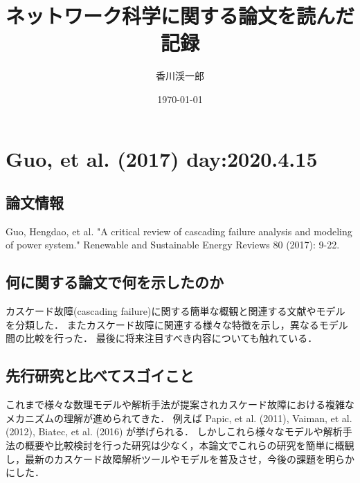 \documentclass[a4paper,11pt]{jsarticle}
\begin{document}
\title{ネットワーク科学に関する論文を読んだ記録}
\author{香川渓一郎}
\date{\today}
\maketitle

\tableofcontents

\newpage

\section{Guo, et al. (2017) day:2020.4.15}
    \subsection{論文情報}
    Guo, Hengdao, et al. "A critical review of cascading failure analysis and modeling of power system." Renewable and Sustainable Energy Reviews 80 (2017): 9-22.
    \subsection{何に関する論文で何を示したのか}
    カスケード故障(cascading failure)に関する簡単な概観と関連する文献やモデルを分類した．
    またカスケード故障に関連する様々な特徴を示し，異なるモデル間の比較を行った．
    最後に将来注目すべき内容についても触れている．
    \subsection{先行研究と比べてスゴイこと}
    これまで様々な数理モデルや解析手法が提案されカスケード故障における複雑なメカニズムの理解が進められてきた．
    例えば Papic, et al. (2011), Vaiman, et al. (2012), Biatec, et al. (2016) が挙げられる．
    しかしこれら様々なモデルや解析手法の概要や比較検討を行った研究は少なく，本論文でこれらの研究を簡単に概観し，最新のカスケード故障解析ツールやモデルを普及させ，今後の課題を明らかにした．
\end{document}

